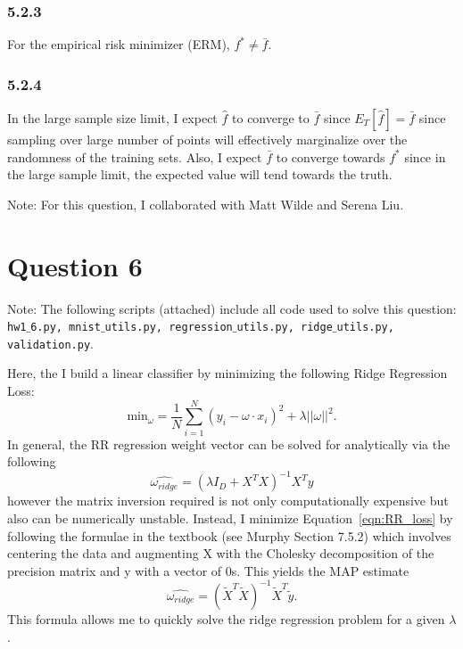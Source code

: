 \documentclass[12pt]{amsart}
\begin{document}
\subsubsection*{5.2.3}
For the empirical risk minimizer (ERM), $f^{*} \neq \bar{f}$.

\subsubsection*{5.2.4}
In the large sample size limit, I expect $\hat{f}$ to converge to $\bar{f}$ since $E_T[\hat{f}] = \bar{f}$ since sampling over large number of points will effectively marginalize over the randomness of the training sets.  Also, I expect $\bar{f}$ to converge towards $f^{*}$ since in the large sample limit, the expected value will tend towards the truth.

Note: For this question, I collaborated with Matt Wilde and Serena Liu.


\section*{Question 6}

Note: The following scripts (attached) include all code used to solve this question: {\tt hw1$\_$6.py, mnist$\_$utils.py, regression$\_$utils.py, ridge$\_$utils.py, validation.py}.

Here, the I build a linear classifier by minimizing the following Ridge Regression Loss:
\begin{equation} \label{eqn:RR_loss}
\text{min}_{\omega} = \frac{1}{N} \sum_{i = 1}^N (y_i - \omega \cdot x_i)^2 + \lambda || \omega ||^2.
\end{equation}
In general, the RR regression weight vector can be solved for analytically via the following
\begin{equation} \label{eqn:RR_w}
\hat{\omega_{ridge}} = (\lambda I_D + X^T X)^{-1} X^T y
\end{equation}
however the matrix inversion required is not only computationally expensive but also can be numerically unstable.  Instead, I minimize Equation~\ref{eqn:RR_loss} by following the formulae in the textbook (see Murphy Section 7.5.2) which involves centering the data and augmenting X with the Cholesky decomposition of the precision matrix and y with a vector of 0s.  This yields the MAP estimate
\begin{equation} \label{eqn:RR_w_murphy}
\hat{\omega_{ridge}} = (\tilde{X}^T \tilde{X})^{-1} \tilde{X}^T \tilde{y}.
\end{equation}
This formula allows me to quickly solve the ridge regression problem for a given $\lambda$.
\end{document}
